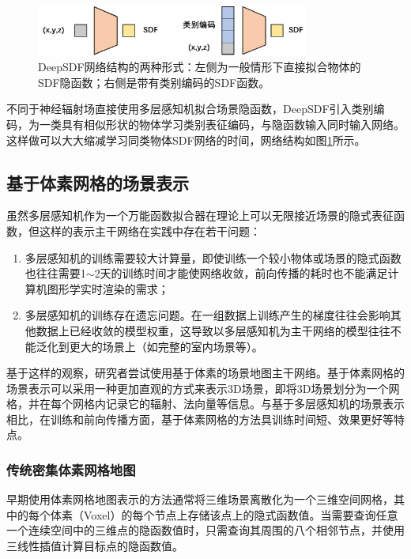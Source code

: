 \begin{figure}[ht]
    \centering
    \includegraphics[width=0.8\textwidth]{undergraduate-thesis/images/related-work/deepSDF.pdf}
    \caption{DeepSDF\cite{park_deepsdf_2019}网络结构的两种形式：左侧为一般情形下直接拟合物体的SDF隐函数；右侧是带有类别编码的SDF函数。}
    \label{fig:related-work DeepSDF}
\end{figure}

不同于神经辐射场直接使用多层感知机拟合场景隐函数，DeepSDF引入类别编码，为一类具有相似形状的物体学习类别表征编码，与隐函数输入同时输入网络。这样做可以大大缩减学习同类物体SDF网络的时间，网络结构如图\ref{fig:related-work DeepSDF}所示。



\subsection{基于体素网格的场景表示}
\label{sec: related-work grid-based implicit representations}
虽然多层感知机作为一个万能函数拟合器在理论上可以无限接近场景的隐式表征函数，但这样的表示主干网络在实践中存在若干问题：
\begin{enumerate}
    \item 多层感知机的训练需要较大计算量，即使训练一个较小物体或场景的隐式函数也往往需要1$\sim$2天的训练时间才能使网络收敛，前向传播的耗时也不能满足计算机图形学实时渲染的需求；
    \item 多层感知机的训练存在遗忘问题。在一组数据上训练产生的梯度往往会影响其他数据上已经收敛的模型权重，这导致以多层感知机为主干网络的模型往往不能泛化到更大的场景上（如完整的室内场景等）。
\end{enumerate}

基于这样的观察，研究者尝试使用基于体素的场景地图主干网络。基于体素网格的场景表示可以采用一种更加直观的方式来表示3D场景，即将3D场景划分为一个网格，并在每个网格内记录它的辐射、法向量等信息。与基于多层感知机的场景表示相比，在训练和前向传播方面，基于体素网格的方法具训练时间短、效果更好等特点。

\subsubsection{传统密集体素网格地图}
早期使用体素网格地图表示的方法\cite{fridovich-keil_plenoxels_2022, kondo_vaxnerf_2021, yu_monosdf_2022}通常将三维场景离散化为一个三维空间网格，其中的每个体素（Voxel）的每个节点上存储该点上的隐式函数值。当需要查询任意一个连续空间中的三维点的隐函数值时，只需查询其周围的八个相邻节点，并使用三线性插值计算目标点的隐函数值。

